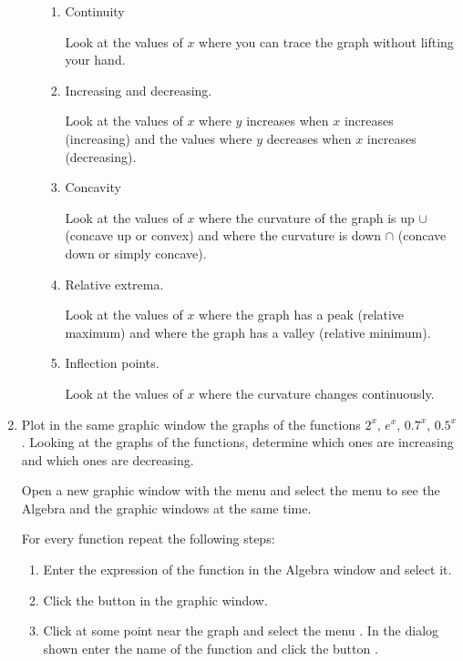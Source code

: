 \begin{enumerate}[leftmargin=*]
\begin{enumerate}
\begin{enumerate}
\item Continuity
\begin{indication}
Look at the values of $x$ where you can trace the graph without lifting your hand. 
\end{indication}

\item Increasing and decreasing.
\begin{indication}
Look at the values of $x$ where $y$ increases when $x$ increases (increasing) and the values where $y$ decreases when $x$ increases (decreasing).
\end{indication}

\item Concavity
\begin{indication}
Look at the values of $x$ where the curvature of the graph is up $\cup$ (concave up or convex) and where the curvature is down $\cap$ (concave down or simply concave).
\end{indication}

\item Relative extrema.
\begin{indication}
Look at the values of $x$ where the graph has a peak (relative maximum) and where the graph has a valley (relative minimum).
\end{indication}

\item Inflection points.
\begin{indication}
Look at the values of $x$ where the curvature changes continuously. 
\end{indication}
\end{enumerate}
\end{enumerate}


\item Plot in the same graphic window the graphs of the functions $2^x$, $e^x$, $0.7^x$, $0.5^x$. 
Looking at the graphs of the functions, determine which ones are increasing and which ones are decreasing. 

\begin{indication}
Open a new graphic window with the menu  and select the menu  to see the Algebra and the graphic windows at the same time. 

For every function repeat the following steps:
\begin{enumerate}
\item Enter the expression of the function in the Algebra window and select it. 
\item Click the button  in the graphic window.
\item Click at some point near the graph and select the menu . 
In the dialog shown enter the name of the function and click the button .
\end{enumerate}
\end{indication}


\end{enumerate}
